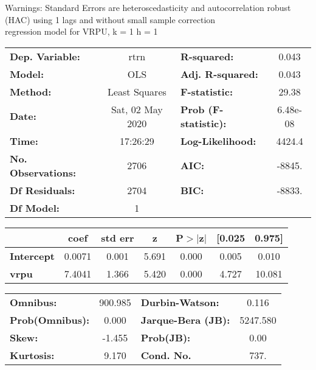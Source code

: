 Warnings: \newline
 [1] Standard Errors are heteroscedasticity and autocorrelation robust (HAC) using 1 lags and without small sample correction\\ 

regression model for VRPU, k = 1 h = 1\begin{center}
\begin{tabular}{lclc}
\toprule
\textbf{Dep. Variable:}    &       rtrn       & \textbf{  R-squared:         } &     0.043   \\
\textbf{Model:}            &       OLS        & \textbf{  Adj. R-squared:    } &     0.043   \\
\textbf{Method:}           &  Least Squares   & \textbf{  F-statistic:       } &     29.38   \\
\textbf{Date:}             & Sat, 02 May 2020 & \textbf{  Prob (F-statistic):} &  6.48e-08   \\
\textbf{Time:}             &     17:26:29     & \textbf{  Log-Likelihood:    } &    4424.4   \\
\textbf{No. Observations:} &        2706      & \textbf{  AIC:               } &    -8845.   \\
\textbf{Df Residuals:}     &        2704      & \textbf{  BIC:               } &    -8833.   \\
\textbf{Df Model:}         &           1      & \textbf{                     } &             \\
\bottomrule
\end{tabular}
\begin{tabular}{lcccccc}
                   & \textbf{coef} & \textbf{std err} & \textbf{z} & \textbf{P$> |$z$|$} & \textbf{[0.025} & \textbf{0.975]}  \\
\midrule
\textbf{Intercept} &       0.0071  &        0.001     &     5.691  &         0.000        &        0.005    &        0.010     \\
\textbf{vrpu}      &       7.4041  &        1.366     &     5.420  &         0.000        &        4.727    &       10.081     \\
\bottomrule
\end{tabular}
\begin{tabular}{lclc}
\textbf{Omnibus:}       & 900.985 & \textbf{  Durbin-Watson:     } &    0.116  \\
\textbf{Prob(Omnibus):} &   0.000 & \textbf{  Jarque-Bera (JB):  } & 5247.580  \\
\textbf{Skew:}          &  -1.455 & \textbf{  Prob(JB):          } &     0.00  \\
\textbf{Kurtosis:}      &   9.170 & \textbf{  Cond. No.          } &     737.  \\
\bottomrule
\end{tabular}
\end{center}

